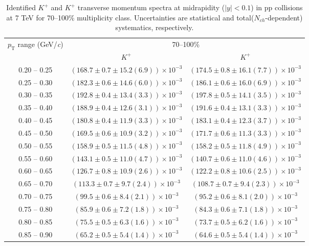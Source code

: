 \begin{table}
\caption{Identified $K^{+}$ and $K^{+}$  transverse momentum spectra at midrapidity ($|y|<0.1$) in pp collisions at 7 TeV for 70--100\% multiplicity class. Uncertainties are statistical and total($N_{ch}$-dependent) systematics, respectively.}
\label{tab:KaonPlus_KaonMinus_70to100}
\begin{center}
\begin{tabular}{ c | c c }
\hline
\multirow{2}{*}{$p_{\mathrm{T}}$ range (GeV/\textit{c})} & \multicolumn{2}{c}{70--100\%} \\ & $K^{+}$& $K^{+}$\\ 
\hline
0.20 -- 0.25 & $(168.7\pm0.7\pm15.2(6.9))\times10^{-3}$ & $(174.5\pm0.8\pm16.1(7.7))\times10^{-3}$ \\ 
0.25 -- 0.30 & $(182.3\pm0.6\pm14.6(6.0))\times10^{-3}$ & $(186.1\pm0.6\pm16.0(6.9))\times10^{-3}$ \\ 
0.30 -- 0.35 & $(192.8\pm0.4\pm13.4(3.3))\times10^{-3}$ & $(197.8\pm0.5\pm14.1(3.5))\times10^{-3}$ \\ 
0.35 -- 0.40 & $(188.9\pm0.4\pm12.6(3.1))\times10^{-3}$ & $(191.6\pm0.4\pm13.1(3.3))\times10^{-3}$ \\ 
0.40 -- 0.45 & $(180.8\pm0.4\pm11.9(3.3))\times10^{-3}$ & $(183.1\pm0.4\pm12.3(3.7))\times10^{-3}$ \\ 
0.45 -- 0.50 & $(169.5\pm0.6\pm10.9(3.2))\times10^{-3}$ & $(171.7\pm0.6\pm11.3(3.3))\times10^{-3}$ \\ 
0.50 -- 0.55 & $(158.9\pm0.5\pm11.5(4.8))\times10^{-3}$ & $(158.2\pm0.5\pm11.8(4.9))\times10^{-3}$ \\ 
0.55 -- 0.60 & $(143.1\pm0.5\pm11.0(4.7))\times10^{-3}$ & $(140.7\pm0.6\pm11.0(4.6))\times10^{-3}$ \\ 
0.60 -- 0.65 & $(126.7\pm0.8\pm10.9(2.6))\times10^{-3}$ & $(122.2\pm0.8\pm10.6(2.5))\times10^{-3}$ \\ 
0.65 -- 0.70 & $(113.3\pm0.7\pm9.7(2.4))\times10^{-3}$ & $(108.7\pm0.7\pm9.4(2.3))\times10^{-3}$ \\ 
0.70 -- 0.75 & $(99.5\pm0.6\pm8.4(2.1))\times10^{-3}$ & $(95.2\pm0.6\pm8.1(2.0))\times10^{-3}$ \\ 
0.75 -- 0.80 & $(85.9\pm0.6\pm7.2(1.8))\times10^{-3}$ & $(84.3\pm0.6\pm7.1(1.8))\times10^{-3}$ \\ 
0.80 -- 0.85 & $(75.5\pm0.5\pm6.3(1.6))\times10^{-3}$ & $(73.7\pm0.5\pm6.2(1.6))\times10^{-3}$ \\ 
0.85 -- 0.90 & $(65.2\pm0.5\pm5.4(1.4))\times10^{-3}$ & $(64.6\pm0.5\pm5.4(1.4))\times10^{-3}$ \\ 

\end{tabular}
\end{center}
\end{table}
